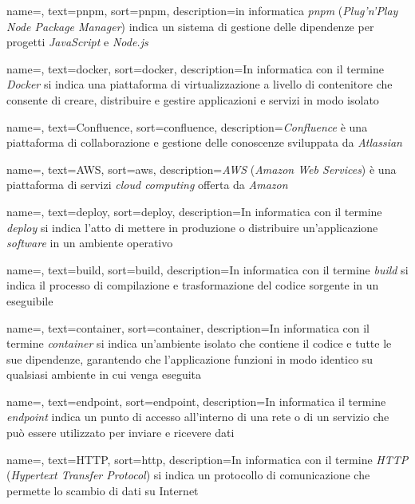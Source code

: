  {
    name=,
    text=pnpm,
    sort=pnpm,
    description={in informatica \emph{pnpm} (\emph{Plug'n'Play Node Package Manager}) indica un sistema di gestione delle dipendenze per progetti \emph{JavaScript} e \emph{Node.js}}
}

 {
    name=,
    text=docker,
    sort=docker,
    description={In informatica con il termine \emph{Docker} si indica una piattaforma di vir\-tua\-liz\-za\-zio\-ne a livello di contenitore che consente di creare, distribuire e gestire applicazioni e servizi in modo isolato}
}

 {
    name=,
    text=Confluence,
    sort=confluence,
    description={\emph{Confluence} è una piattaforma di collaborazione e gestione delle conoscenze sviluppata da \emph{Atlassian}}
}

 {
    name=,
    text=AWS,
    sort=aws,
    description={\emph{AWS} (\emph{Amazon Web Services}) è una piattaforma di servizi \emph{cloud computing} offerta da \emph{Amazon}}
}

 {
    name=,
    text=deploy,
    sort=deploy,
    description={In informatica con il termine \emph{deploy} si indica l'atto di mettere in produzione o distribuire un'applicazione \emph{software} in un ambiente operativo}
}

 {
    name=,
    text=build,
    sort=build,
    description={In informatica con il termine \emph{build} si indica il processo di compilazione e trasformazione del codice sorgente in un eseguibile}
}

 {
    name=,
    text=container,
    sort=container,
    description={In informatica con il termine \emph{container} si indica un'ambiente isolato che contiene il codice e tutte le sue dipendenze, garantendo che l'applicazione funzioni in modo identico su qualsiasi ambiente in cui venga eseguita}
}

 {
    name=,
    text=endpoint,
    sort=endpoint,
    description={In informatica il termine \emph{endpoint} indica un punto di accesso all'interno di una rete o di un servizio che può essere utilizzato per inviare e ricevere dati}
}

 {
    name=,
    text=HTTP,
    sort=http,
    description={In informatica con il termine \emph{HTTP} (\emph{Hypertext Transfer Protocol}) si indica un protocollo di comunicazione che permette lo scambio di dati su Internet}
}


